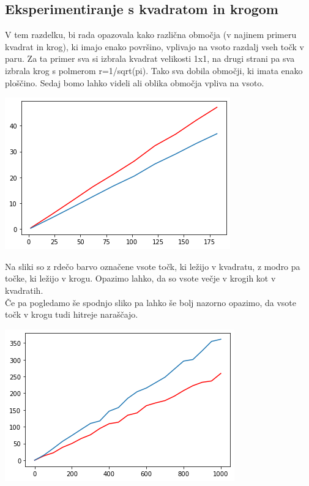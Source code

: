 \documentclass[12pt, a4paper]{article}
\begin{document}
\subsection{Eksperimentiranje s kvadratom in krogom}
V tem razdelku, bi rada opazovala kako različna območja (v najinem primeru kvadrat in krog), ki imajo enako površino, vplivajo na vsoto razdalj vseh točk v paru. Za ta primer sva si izbrala kvadrat velikosti 1x1, na drugi strani pa sva izbrala krog s polmerom r=1/sqrt(pi). Tako sva dobila območji, ki imata enako ploščino. Sedaj bomo lahko videli ali oblika območja vpliva na vsoto.\\
\begin{center}
\includegraphics{primerjava_krog_kvadrat.png}
\end{center}
Na sliki so z rdečo barvo označene vsote točk, ki ležijo v kvadratu, z modro pa točke, ki ležijo v krogu. Opazimo lahko, da so vsote večje v krogih kot v kvadratih.\\
Če pa pogledamo še spodnjo sliko pa lahko še bolj nazorno opazimo, da vsote točk v krogu tudi hitreje naraščajo.
\begin{center}
\includegraphics{primerjava_krog_kvadrat_2.png}
\end{center}
\end{document}
